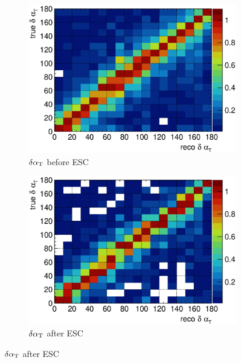           \begin{figure}
          \centering
          \begin{subfigure}[b]{\dbfigwid\textwidth}
               \centering
               \includegraphics[width=\textwidth]{figures/perf/tki/dalphat_colnor_resmat_al13.eps}
               \caption{$\delta\alpha_\textrm{T}$ before ESC}
               \label{subfig:esc-dalpha-bfesc}
          \end{subfigure}
          \begin{subfigure}[b]{\dbfigwid\textwidth}
               \centering
               \includegraphics[width=\textwidth]{figures/perf/tki/dalphat_colnor_resmat_al14.eps}
               \caption{$\delta\alpha_\textrm{T}$ after ESC}
               \label{subfig:esc-dalpha-afesc}
          \end{subfigure}

\end{figure}
